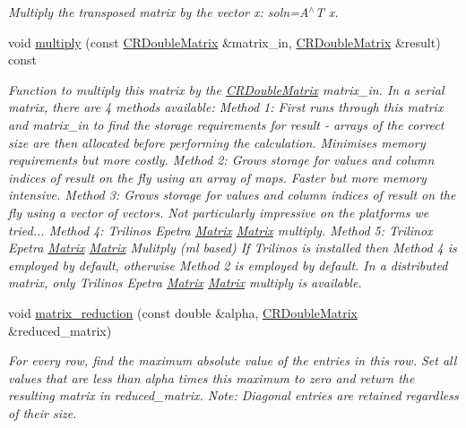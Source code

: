 \begin{DoxyCompactItemize}
\begin{DoxyCompactList}\small\item\em Multiply the transposed matrix by the vector x\+: soln=A$^\wedge$T x. \end{DoxyCompactList}\item 
void \hyperlink{classoomph_1_1CRDoubleMatrix_af08fd73a7edbdbde9facf47b913e3e43}{multiply} (const \hyperlink{classoomph_1_1CRDoubleMatrix}{C\+R\+Double\+Matrix} \&matrix\+\_\+in, \hyperlink{classoomph_1_1CRDoubleMatrix}{C\+R\+Double\+Matrix} \&result) const
\begin{DoxyCompactList}\small\item\em Function to multiply this matrix by the \hyperlink{classoomph_1_1CRDoubleMatrix}{C\+R\+Double\+Matrix} matrix\+\_\+in. In a serial matrix, there are 4 methods available\+: Method 1\+: First runs through this matrix and matrix\+\_\+in to find the storage requirements for result -\/ arrays of the correct size are then allocated before performing the calculation. Minimises memory requirements but more costly. Method 2\+: Grows storage for values and column indices of result \textquotesingle{}on the fly\textquotesingle{} using an array of maps. Faster but more memory intensive. Method 3\+: Grows storage for values and column indices of result \textquotesingle{}on the fly\textquotesingle{} using a vector of vectors. Not particularly impressive on the platforms we tried... Method 4\+: Trilinos Epetra \hyperlink{classoomph_1_1Matrix}{Matrix} \hyperlink{classoomph_1_1Matrix}{Matrix} multiply. Method 5\+: Trilinox Epetra \hyperlink{classoomph_1_1Matrix}{Matrix} \hyperlink{classoomph_1_1Matrix}{Matrix} Mulitply (ml based) If Trilinos is installed then Method 4 is employed by default, otherwise Method 2 is employed by default. In a distributed matrix, only Trilinos Epetra \hyperlink{classoomph_1_1Matrix}{Matrix} \hyperlink{classoomph_1_1Matrix}{Matrix} multiply is available. \end{DoxyCompactList}\item 
void \hyperlink{classoomph_1_1CRDoubleMatrix_a3853068b7fce9e83bc817930262e9ca1}{matrix\+\_\+reduction} (const double \&alpha, \hyperlink{classoomph_1_1CRDoubleMatrix}{C\+R\+Double\+Matrix} \&reduced\+\_\+matrix)
\begin{DoxyCompactList}\small\item\em For every row, find the maximum absolute value of the entries in this row. Set all values that are less than alpha times this maximum to zero and return the resulting matrix in reduced\+\_\+matrix. Note\+: Diagonal entries are retained regardless of their size. \end{DoxyCompactList}\item 

\end{DoxyCompactItemize}
